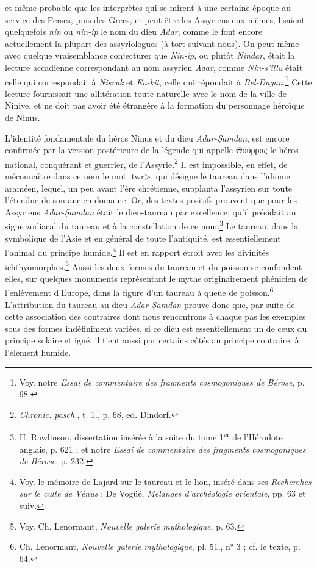 \documentclass[a4paper, 11pt, oneside, landscape]{article}
\begin{document}
et même probable que les interprètes qui se mirent à une certaine époque au service des Perses, puis des Grecs, et peut-être les Assyriens eux-mêmes, lisaient quelquefois \emph{nin} ou \emph{nin-ip} le nom du dieu \emph{Adar}, comme le font encore actuellement la plupart des assyriologues (à tort suivant nous). On peut même avec quelque vraisemblance conjecturer que \emph{Nin-ip}, ou plutôt \emph{Nindar}, était la lecture accadienne correspondant au nom assyrien \emph{Adar}, comme \emph{Nin-s'illu} était celle qui correspondait à \emph{Nisruk} et \emph{En-kit}, celle qui répondait à \emph{Bel-Dagan}.\footnote{Voy. notre \emph{Essai de commentaire des fragments cosmogoniques de Bérose}, p. 98.} Cette lecture fournissait une allitération toute naturelle avec le nom de la ville de Ninive, et ne doit pas avoir été étrangère à la formation du personnage héroïque de Ninus.

L'identité fondamentale du héros Ninus et du dieu \emph{Adar-\d{S}amdan}, est encore confirmée par la version postérieure de la légende qui appelle Θούρρας le héros national, conquérant et guerrier, de l'Assyrie.\footnote{\emph{Chronic. pasch.}, t. 1., p. 68, ed. Dindorf.} Il est impossible, en effet, de méconnaître dans ce nom le mot \<.twr>, qui désigne le taureau dans l'idiome araméen, lequel, un peu avant l'ère chrétienne, supplanta l'assyrien sur toute l'étendue de son ancien domaine. Or, des textes positifs prouvent que pour les Assyriens \emph{Adar-\d{S}amdan} était le dieu-taureau par excellence, qu'il présidait au signe zodiacal du taureau et à la constellation de ce nom.\footnote{H. Rawlinson, dissertation insérée à la suite du tome 1\textsuperscript{er} de l'Hérodote anglais, p. 621 ; et notre \emph{Essai de commentaire des fragments cosmogoniques de Bérose}, p. 232.} Le taureau, dans la symbolique de l'Asie et en général de toute l'antiquité, est essentiellement l'animal du principe humide.\footnote{Voy. le mémoire de Lajard sur le taureau et le lion, inséré dans ses \emph{Recherches sur le culte de Vénus} ; De Vogüé, \emph{Mélanges d'archéologie orientale}, pp. 63 et suiv.} Il est en rapport étroit avec les divinités ichthyomorphes.\footnote{Voy. Ch. Lenormant, \emph{Nouvelle galerie mythologique}, p. 63.} Aussi les deux formes du taureau et du poisson se confondent-elles, sur quelques monuments représentant le mythe originairement phénicien de l'enlèvement d'Europe, dans la figure d'un taureau à queue de poisson.\footnote{Ch. Lenormant, \emph{Nouvelle galerie mythologique}, pl. 51., n° 3 ; cf. le texte, p. 64.} L'attribution du taureau au dieu \emph{Adar-\d{S}amdan} prouve donc que, par suite de cette association des contraires dont nous rencontrons à chaque pas les exemples sous des formes indéfiniment variées, si ce dieu est essentiellement un de ceux du principe solaire et igné, il tient aussi par certains côtés au principe contraire, à l'élément humide.
\end{document}
